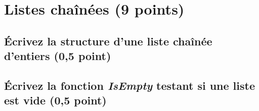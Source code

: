 \documentclass[11pt,a4paper]{article}
\begin{document}


\vspace*{-0.75cm}


\section{Listes chaînées (9 points)}


\vspace*{-0.50cm}

\begin{table}[ht!]
  \centering
  \begin{minipage}{0.50\textwidth}
    \centering

    \subsection{\'Ecrivez la structure d'une liste chaînée d'entiers (0,5 point) }

    \begin{center}
    \end{center}

  \end{minipage}
  \hfillx
  \begin{minipage}{0.50\textwidth}
    \centering

    \subsection{\'Ecrivez la fonction \textit{IsEmpty} testant si une liste est vide (0,5 point) }

    \begin{center}
    \end{center}

  \end{minipage}
\end{table}
\end{document}
